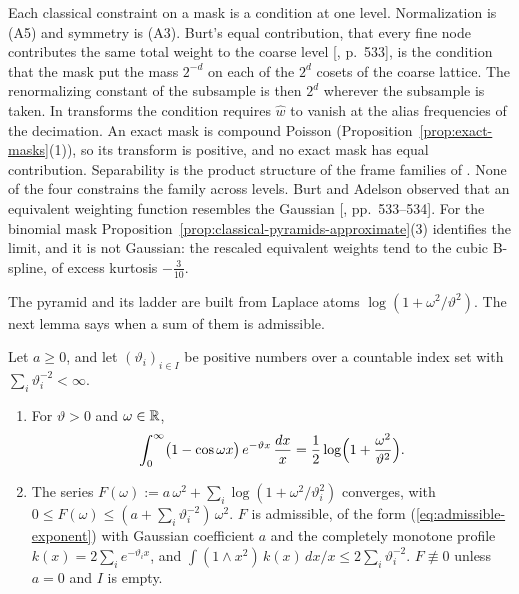 Each classical constraint on a mask is a condition at one level. Normalization is (A5) and symmetry
is (A3). Burt's equal contribution, that every fine node contributes the same total weight to the
coarse level [, p.~533], is the condition that the mask put the mass
$2^{-d}$ on each of the $2^d$ cosets of the coarse lattice. The renormalizing constant of the
subsample is then $2^d$ wherever the subsample is taken. In transforms the condition requires
$\widehat w$ to vanish at the alias frequencies of the decimation. An exact mask is compound
Poisson (Proposition~\ref{prop:exact-masks}(1)), so its transform is positive, and no exact mask
has equal contribution. Separability is the product structure of the frame families of
. None of the four constrains the family across levels. Burt
and Adelson observed that an equivalent weighting function resembles the Gaussian
[, pp.~533--534]. For the binomial mask
Proposition~\ref{prop:classical-pyramids-approximate}(3) identifies the limit, and it is not
Gaussian: the rescaled equivalent weights tend to the cubic B-spline, of excess kurtosis
$-\tfrac3{10}$.

The \Matern{} pyramid and its ladder are built from Laplace atoms $\log(1 + \omega^2/\vartheta^2)$.
The next lemma says when a sum of them is admissible.

\begin{lemma}
\label{lem:laplace-atoms-admissible}

Let $a \ge 0$, and let $(\vartheta_i)_{i \in I}$ be positive numbers over a countable index set
with $\sum_i\vartheta_i^{-2} < \infty$.
\begin{enumerate}
\item For $\vartheta > 0$ and $\omega \in \mathbb{R}$,
\[
  \int_0^\infty\bigl(1 - \cos\omega x\bigr)\,e^{-\vartheta x}\,\frac{dx}{x}
  = \frac12\log\Bigl(1 + \frac{\omega^2}{\vartheta^2}\Bigr).
\]
\item The series $F(\omega) := a\,\omega^2 + \sum_i\log(1 + \omega^2/\vartheta_i^2)$ converges, with
$0 \le F(\omega) \le (a + \sum_i\vartheta_i^{-2})\,\omega^2$. $F$ is admissible, of the form
(\ref{eq:admissible-exponent}) with Gaussian coefficient $a$ and the completely monotone profile
$k(x) = 2\sum_ie^{-\vartheta_ix}$, and $\int(1 \wedge x^2)\,k(x)\,dx/x \le 2\sum_i\vartheta_i^{-2}$.
$F \not\equiv 0$ unless $a = 0$ and $I$ is empty.
\end{enumerate}
\end{lemma}

